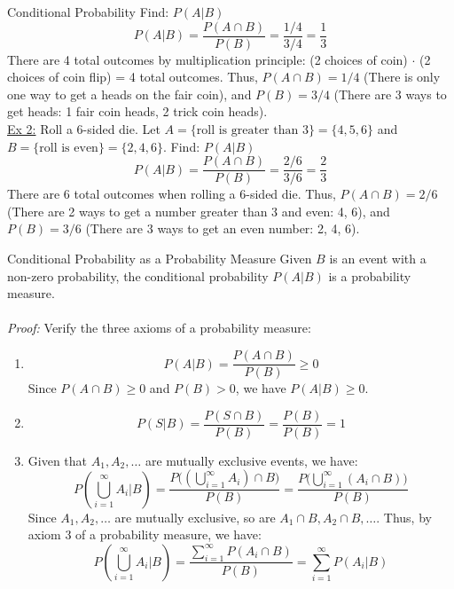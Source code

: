 ﻿\documentclass[12pt]{article}
\begin{document}
\begin{definition}{Conditional Probability}
Find: $P(A|B)$
\[P(A|B) = \frac{P(A \cap B)}{P(B)} = \frac{1/4}{3/4} = \frac{1}{3}\]
There are 4 total outcomes by multiplication principle: (2 choices of coin) $\cdot$ (2 choices of coin flip) = 4 total outcomes. Thus, $P(A \cap B) = 1/4$ (There is only one way to get a heads on the fair coin), and $P(B) = 3/4$ (There are 3 ways to get heads: 1 fair coin heads, 2 trick coin heads).\\
\underline{Ex 2:} Roll a 6-sided die. Let $A = \{\text{roll is greater than 3}\} = \{4, 5, 6\}$ and $B = \{\text{roll is even}\} = \{2, 4, 6\}$.
Find: $P(A|B)$
\[P(A|B) = \frac{P(A \cap B)}{P(B)} = \frac{2/6}{3/6} = \frac{2}{3}\]
There are 6 total outcomes when rolling a 6-sided die. Thus, $P(A \cap B) = 2/6$ (There are 2 ways to get a number greater than 3 and even: 4, 6), and $P(B) = 3/6$ (There are 3 ways to get an even number: 2, 4, 6).
\end{definition}

\begin{theorem}{Conditional Probability as a Probability Measure}
    Given $B$ is an event with a non-zero probability, the conditional probability $P(A|B)$ is a probability measure.\\\\
    \textit{Proof:} Verify the three axioms of a probability measure:
    \begin{enumerate}
        \item \[P(A|B) = \frac{P(A \cap B)}{P(B)} \geq 0\]
        Since $P(A \cap B) \geq 0$ and $P(B) > 0$, we have $P(A|B) \geq 0$.
        \item \[P(S|B) = \frac{P(S \cap B)}{P(B)} = \frac{P(B)}{P(B)} = 1\]
        \item Given that $A_1, A_2, \ldots$ are mutually exclusive events, we have:
        \[P\left(\bigcup_{i=1}^\infty A_i | B\right) = \frac{P\bigg(\left(\bigcup_{i=1}^\infty A_i\right) \cap B\bigg)}{P(B)} = \frac{P\bigg(\bigcup_{i=1}^\infty\left(A_i \cap B\right)\bigg)}{P(B)}\]
        Since $A_1, A_2, \ldots$ are mutually exclusive, so are $A_1 \cap B, A_2 \cap B, \ldots$. Thus, by axiom 3 of a probability measure, we have:
        \[P\left(\bigcup_{i=1}^\infty A_i | B\right) = \frac{\sum_{i=1}^\infty P(A_i \cap B)}{P(B)} = \sum_{i=1}^\infty P(A_i | B)\]
    \end{enumerate}
\end{theorem}
\end{document}
